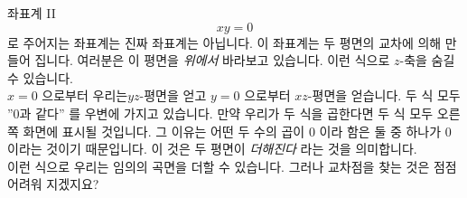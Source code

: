\begin{surferPage}{좌표계 II}
\[xy=0\]
로 주어지는 좌표계는 진짜 좌표계는 아닙니다. 이 좌표계는 두 평면의 교차에 의해 만들어 집니다. 여러분은 이 평면을 {\it 위에서} 바라보고 있습니다. 이런 식으로 $z$-축을 숨길 수 있습니다. \\
\vspace{0.3cm}
$x=0$ 으로부터 우리는$yz$-평면을 얻고 $y=0$ 으로부터 $xz$-평면을 얻습니다.
두 식 모두 ''$0$과 같다'' 를 우변에 가지고 있습니다. 만약 우리가 두 식을 곱한다면 두 식 모두 오른쪽 화면에 표시될 것입니다. 그 이유는 어떤 두 수의 곱이 $0$ 이라 함은 둘 중 하나가 $0$ 이라는 것이기 때문입니다.  이 것은 두 평면이 {\it 더해진다} 라는 것을 의미합니다.\\
이런 식으로 우리는 임의의 곡면을 더할 수 있습니다. 그러나 교차점을 찾는 것은 점점 어려워 지겠지요?
\end{surferPage}
